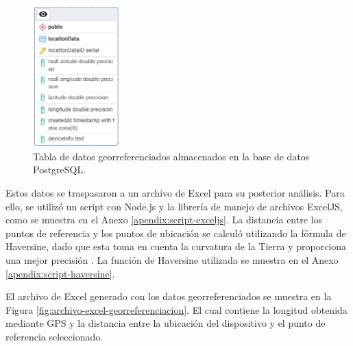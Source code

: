 \begin{figure}[H]
    \centering
    \includegraphics[width=0.3\textwidth]{chapters/III-resultados-y-discusion/resources/images/tabla-georreferenciacion.png}
    \caption{Tabla de datos georreferenciados almacenados en la base de datos PostgreSQL.}
    \label{fig:tabla-georreferenciacion}
\end{figure}

Estos datos se traspasaron a un archivo de Excel para su posterior análisis. Para ello, se utilizó un script con
Node.js y la librería de manejo de archivos ExcelJS, como se muestra en el Anexo \ref{apendix:script-exceljs}. La distancia entre
los puntos de referencia y los puntos de ubicación se calculó utilizando la fórmula de Haversine, dado que esta toma en cuenta
la curvatura de la Tierra y proporciona una mejor precisión \cite{basyirDeterminationNearestEmergency2017}. La función de
Haversine utilizada se muestra en el Anexo \ref{apendix:script-haversine}.

%     

%     

El archivo de Excel generado con los datos georreferenciados se muestra en la Figura \ref{fig:archivo-excel-georreferenciacion}. El cual
contiene la longitud obtenida mediante GPS y la distancia entre la ubicación del dispositivo y el punto de referencia seleccionado.


